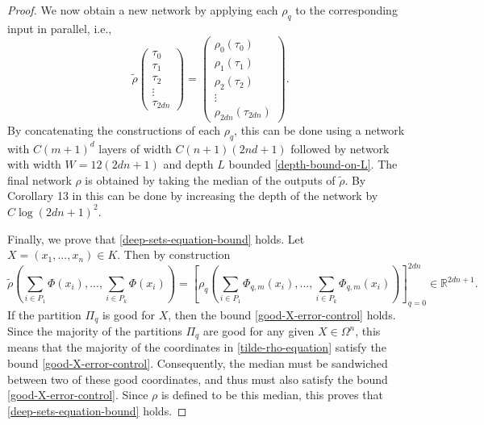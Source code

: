 \documentclass[twoside,11pt]{article}
\begin{document}
\begin{proof}
        We now obtain a new network by applying each $\rho_q$ to the corresponding input in parallel, i.e.,
        \begin{equation}
            \widetilde{\rho}\begin{pmatrix}
                \tau_0\\
                \tau_1\\
                \tau_2\\
                \vdots\\
                \tau_{2dn}
            \end{pmatrix} = \begin{pmatrix}
                \rho_0(\tau_0)\\
                \rho_1(\tau_1)\\
                \rho_2(\tau_2)\\
                \vdots\\
                \rho_{2dn}(\tau_{2dn})
            \end{pmatrix}.
        \end{equation}
By concatenating the constructions of each $\rho_q$, this can be done using a network with $C(m+1)^d$ layers of width $C(n+1)(2nd+1)$ followed by network with width $W = 12(2dn+1)$ and depth $L$ bounded \eqref{depth-bound-on-L}. The final network $\rho$ is obtained by taking the median of the outputs of $\widetilde{\rho}$. By Corollary 13 in \cite{siegel2023optimal} this can be done by increasing the depth of the network by $C\log(2dn+1)^2$.

Finally, we prove that \eqref{deep-sets-equation-bound} holds. Let $X = (x_1,...,x_n)\in K$. Then by construction
\begin{equation}\label{tilde-rho-equation}
    \widetilde{\rho}\left(\sum_{i\in P_1} \Phi(x_i),...,\sum_{i\in P_k} \Phi(x_i)\right) = \left[\rho_q\left(\sum_{i\in P_1} \Phi_{q,m}(x_i),...,\sum_{i\in P_k} \Phi_{q,m}(x_i)\right)\right]_{q=0}^{2dn}\in \mathbb{R}^{2dn+1}.
\end{equation}
If the partition $\Pi_q$ is good for $X$, then the bound \eqref{good-X-error-control} holds. Since the majority of the partitions $\Pi_q$ are good for any given $X\in \Omega^n$, this means that the majority of the coordinates in \eqref{tilde-rho-equation} satisfy the bound \eqref{good-X-error-control}. Consequently, the median must be sandwiched between two of these good coordinates, and thus must also satisfy the bound \eqref{good-X-error-control}. Since $\rho$ is defined to be this median, this proves that \eqref{deep-sets-equation-bound} holds.
\end{proof}
\end{document}
